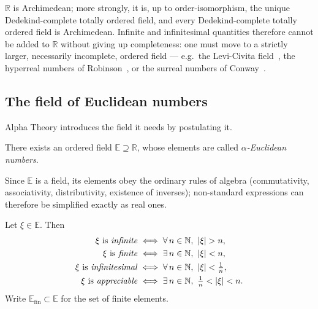 \begin{remark}
\label{rem:R-archimedean}
$\mathbb{R}$ is Archimedean; more strongly, it is, up to order-isomorphism, the
unique Dedekind-complete totally ordered field, and every Dedekind-complete totally
ordered field is Archimedean. Infinite and
infinitesimal quantities therefore cannot be added to $\mathbb{R}$ without giving up
completeness: one must move to a strictly larger, necessarily incomplete, ordered
field --- e.g.\ the Levi-Civita field~\cite{levicivita1892infiniti}, the hyperreal
numbers of Robinson~\cite{robinson1996nonstandard}, or the surreal numbers of
Conway~\cite{conway2000numbers}.
\end{remark}

\subsection{The field of Euclidean numbers}

Alpha Theory introduces the field it needs by postulating it.

\begin{axiom}
\label{ax:field}
There exists an ordered field $\mathbb{E} \supseteq \mathbb{R}$, whose elements are
called \emph{$\alpha$-Euclidean numbers}.
\end{axiom}

Since $\mathbb{E}$ is a field, its elements obey the ordinary rules of algebra
(commutativity, associativity, distributivity, existence of inverses); non-standard
expressions can therefore be simplified exactly as real ones.

\begin{definition}
\label{def:magnitudes}
Let $\xi \in \mathbb{E}$. Then
\begin{align*}
  \xi \text{ is \emph{infinite}}      &\iff \forall\, n \in \mathbb{N},\ |\xi| > n, \\
  \xi \text{ is \emph{finite}}        &\iff \exists\, n \in \mathbb{N},\ |\xi| < n, \\
  \xi \text{ is \emph{infinitesimal}} &\iff \forall\, n \in \mathbb{N},\ |\xi| < \tfrac{1}{n}, \\
  \xi \text{ is \emph{appreciable}}   &\iff \exists\, n \in \mathbb{N},\ \tfrac{1}{n} < |\xi| < n.
\end{align*}
Write $\mathbb{E}_{\mathrm{fin}} \subset \mathbb{E}$ for the set of finite elements.
\end{definition}

